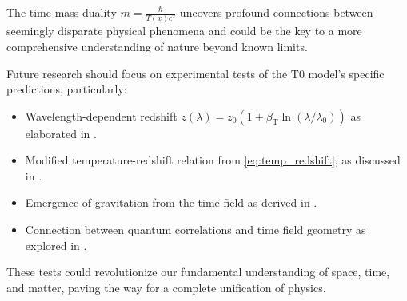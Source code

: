 \documentclass[12pt,a4paper]{article}
\newcommand{\Tfield}{T(x)}
\newcommand{\betaT}{\beta_{\text{T}}}
\begin{document}
	The time-mass duality \(m = \frac{\hbar}{\Tfield c^2}\) uncovers profound connections between seemingly disparate physical phenomena and could be the key to a more comprehensive understanding of nature beyond known limits.
	
	Future research should focus on experimental tests of the T0 model's specific predictions, particularly:
	
	\begin{itemize}
		\item Wavelength-dependent redshift \(z(\lambda) = z_0 (1 + \betaT \ln(\lambda/\lambda_0))\) as elaborated in \cite{pascher_messdifferenzen_2025}.
		\item Modified temperature-redshift relation from \cref{eq:temp_redshift}, as discussed in \cite{pascher_temp_2025}.
		\item Emergence of gravitation from the time field as derived in \cite{pascher_emergente_gravitation_2025}.
		\item Connection between quantum correlations and time field geometry as explored in \cite{pascher_feldtheorie_2025}.
	\end{itemize}
	
	These tests could revolutionize our fundamental understanding of space, time, and matter, paving the way for a complete unification of physics.
	
\end{document}
